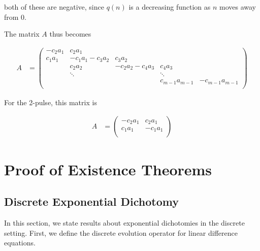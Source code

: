 \documentclass[12pt]{article}
\begin{document}
both of these are negative, since $q(n)$ is a decreasing function as $n$ moves away from 0.

The matrix $A$ thus becomes

\begin{align*}
A &= \begin{pmatrix}
-c_2 a_1 & c_2 a_1 & & &  \\
c_1 a_1 & -c_1 a_1 - c_3 a_2 & c_3 a_2 \\
& c_2 a_2 & -c_2 a_2 - c_4 a_3 & c_4 a_3 \\
& \ddots & & \ddots \\
& & & c_{m-1} a_{m-1} & -c_{m-1} a_{m-1}  \\
\end{pmatrix}
\end{align*}

For the 2-pulse, this matrix is

\begin{align*}
A &= \begin{pmatrix}
-c_2 a_1 & c_2 a_1 \\
c_1 a_1 & -c_1 a_1  \\
\end{pmatrix}
\end{align*}




\section{Proof of Existence Theorems}

\subsection{Discrete Exponential Dichotomy}

In this section, we state results about exponential dichotomies in the discrete setting. First, we define the discrete evolution operator for linear difference equations.
\end{document}
